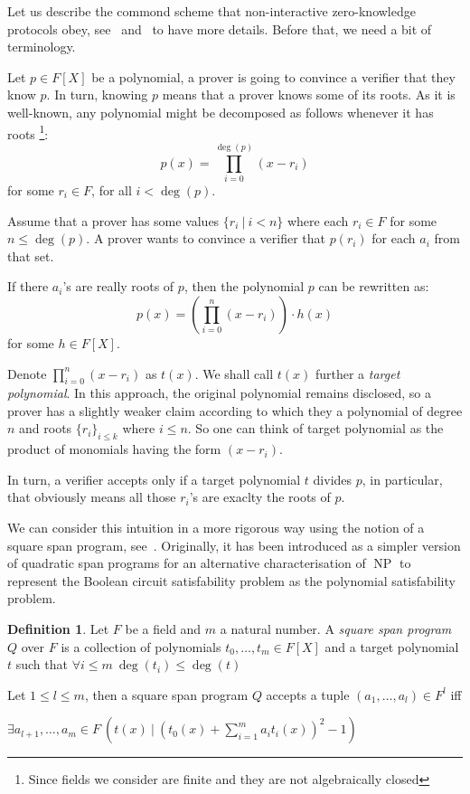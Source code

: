 \documentclass{article}
\theoremstyle{definition}
\newtheorem{definition}{Definition}[section]
\theoremstyle{remark}
\begin{document}
Let us describe the commond scheme that non-interactive zero-knowledge protocols obey, see~\cite{petkus2019and} and~\cite{bitansky2012extractable} to have more details. Before that, we need a bit of terminology.

Let $p \in F[X]$ be a polynomial, a prover is going to convince a verifier that they know $p$. In turn, knowing $p$ means that a prover knows some of its roots. 
As it is well-known, any polynomial might be decomposed as follows whenever it has roots \footnote{Since fields we consider are finite and they are not algebraically closed}:
\begin{equation}
p(x) = \prod_{i = 0}^{\deg(p)} (x - r_i)
\end{equation}
for some $r_i \in F$, for all $i < \deg(p)$.

Assume that a prover has some values $\{ r_i \: | \: i < n\}$ where each $r_i \in F$ for some $n \leq \deg(p)$.
A prover wants to convince a verifier that $p(r_i)$ for each $a_i$ from that set.

If there $a_i$'s are really roots of $p$, then the polynomial $p$ can be rewritten as:
\begin{equation}
p(x) = \left( \prod_{i = 0}^n (x - r_i) \right) \cdot h(x)
\end{equation}
for some $h \in F[X]$.

Denote $\prod_{i = 0}^n (x - r_i)$ as $t(x)$. We shall call $t(x)$ further a \emph{target polynomial}.
In this approach, the original polynomial remains disclosed, so a prover has a slightly weaker claim according to
which they a polynomial of degree $n$ and roots $\{r_i\}_{i \leq k}$ where $i \leq n$. 
So one can think of target polynomial as the product of monomials having the form $(x - r_i)$.

In turn, a verifier accepts only if a target polynomial $t$ divides $p$, in particular, that obviously means all those $r_i$'s are exaclty the roots of $p$.

We can consider this intuition in a more rigorous way using the notion of a square span program, see~\cite{danezis2014square}.
Originally, it has been introduced as a simpler version of quadratic span programs for an alternative characterisation of $\operatorname{NP}$
to represent the Boolean circuit satisfability problem as the polynomial satisfability problem.

\begin{definition}
Let $F$ be a field and $m$ a natural number. A \emph{square span program} $Q$ over $F$ is a
collection of polynomials $t_0, \dots, t_m \in F[X]$ and a target polynomial $t$
such that $\forall i \leq m \: \deg(t_i) \leq \deg(t)$

Let $1 \leq l \leq m$, then a square span program $Q$ accepts a tuple $(a_1, \dots, a_l) \in F^l$ iff

\begin{center}
$\exists a_{l + 1}, \dots, a_m \in F \: \left( t(x) \: | \: {\left( t_0(x) + \sum \limits_{i = 1}^m a_i t_i(x) \right)}^2 - 1 \right)$
\end{center}
\end{definition}
\end{document}
